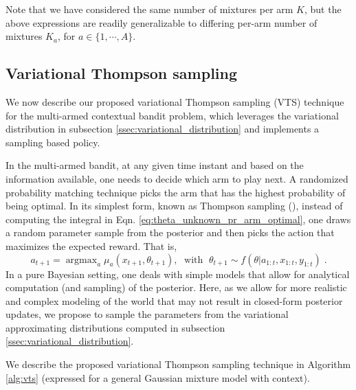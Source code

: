 \documentclass[10pt]{article}
\newcommand{\argmax}{\mathop{\mathrm{argmax}}}
\begin{document}
Note that we have considered the same number of mixtures per arm $K$, but the above expressions are readily generalizable to differing per-arm number of mixtures $K_a$, for $a\in\{1, \cdots, A\}$.

\subsection{Variational Thompson sampling}
\label{ssec:variational_thompson_sampling}

We now describe our proposed variational Thompson sampling (VTS) technique for the multi-armed contextual bandit problem, which leverages the variational distribution in subsection \ref{ssec:variational_distribution} and implements a sampling based policy.

In the multi-armed bandit, at any given time instant and based on the information available, one needs to decide which arm to play next. A randomized probability matching technique picks the arm that has the highest probability of being optimal. In its simplest form, known as Thompson sampling (\cite{j-Thompson1935}), instead of computing the integral in Eqn. \ref{eq:theta_unknown_pr_arm_optimal}, one draws a random parameter sample from the posterior and then picks the action that maximizes the expected reward. That is, 
\begin{equation}
a_{t+1}=\argmax_{a}\mu_{a}(x_{t+1},\theta_{t+1}), \; \text{ with } \; \theta_{t+1} \sim f(\theta|a_{1:t}, x_{1:t}, y_{1:t}) \; .
\end{equation}
In a pure Bayesian setting, one deals with simple models that allow for analytical computation (and sampling) of the posterior. Here, as we allow for more realistic and complex modeling of the world that may not result in closed-form posterior updates, we propose to sample the parameters from the variational approximating distributions computed in subsection \ref{ssec:variational_distribution}.

We describe the proposed variational Thompson sampling technique in Algorithm \ref{alg:vts} (expressed for a general Gaussian mixture model with context).
\end{document}
